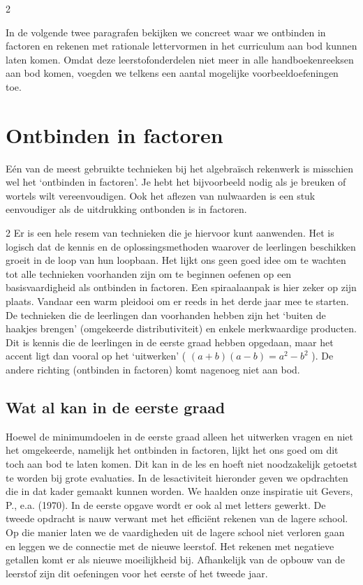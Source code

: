 \begin{multicols}{2}

In de volgende twee paragrafen bekijken we concreet waar we ontbinden in factoren en rekenen met rationale lettervormen in het curriculum aan bod kunnen laten komen. Omdat deze leerstofonderdelen niet meer in alle handboekenreeksen aan bod komen, voegden we telkens een aantal mogelijke voorbeeldoefeningen toe.

 
\section{Ontbinden in factoren}

Eén van de meest gebruikte technieken bij het algebraïsch rekenwerk is misschien wel het ‘ontbinden in factoren’. Je hebt het bijvoorbeeld nodig als je breuken of wortels wilt vereenvoudigen. Ook het aflezen van nulwaarden is een stuk eenvoudiger als de uitdrukking ontbonden is in factoren. 
\end{multicols}
\begin{multicols}{2}
Er is een hele resem van technieken die je hiervoor kunt aanwenden. Het is logisch dat de kennis en de oplossingsmethoden waarover de leerlingen beschikken groeit in de loop van hun loopbaan. Het lijkt ons geen goed idee om te wachten tot alle technieken voorhanden zijn om te beginnen oefenen op een basisvaardigheid als ontbinden in factoren. Een spiraalaanpak is hier zeker op zijn plaats. Vandaar een warm pleidooi om er reeds in het derde jaar mee te starten. De technieken die de leerlingen dan voorhanden hebben zijn het ‘buiten de haakjes brengen’ (omgekeerde distributiviteit) en enkele merkwaardige producten. Dit is kennis die de leerlingen in de eerste graad hebben opgedaan, maar het accent ligt dan vooral op het ‘uitwerken’ ( $(a+b)(a-b)=a^2-b^2$ ). De andere richting (ontbinden in factoren) komt nagenoeg niet aan bod. 
	\subsection{Wat al kan in de eerste graad}

Hoewel de minimumdoelen in de eerste graad alleen het uitwerken vragen en niet het omgekeerde, namelijk het ontbinden in factoren, lijkt het ons goed om dit toch aan bod te laten komen. Dit kan in de les en hoeft niet noodzakelijk getoetst te worden bij grote evaluaties. In de lesactiviteit hieronder geven we opdrachten die in dat kader gemaakt kunnen worden. We haalden onze inspiratie uit Gevers, P., e.a. (1970). In de eerste opgave wordt er ook al met letters gewerkt. De tweede opdracht is nauw verwant met het efficiënt rekenen van de lagere school. Op die manier laten we de vaardigheden uit de lagere school niet verloren gaan en leggen we de connectie met de nieuwe leerstof. Het rekenen met negatieve getallen komt er als nieuwe moeilijkheid bij.  Afhankelijk van de opbouw van de leerstof zijn dit oefeningen voor het eerste of het tweede jaar. 


\end{multicols}
